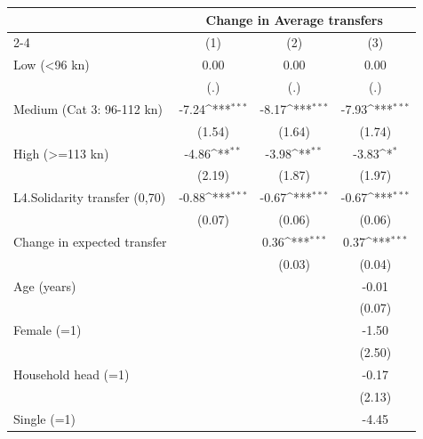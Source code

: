{
\def\sym#1{\ifmmode^{#1}\else\(^{#1}\)\fi}
\begin{tabular}{l*{3}{c}}
\toprule
                    &\multicolumn{3}{c}{Change in Average transfers}                  \\\cmidrule(lr){2-4}
                    &\multicolumn{1}{c}{(1)}         &\multicolumn{1}{c}{(2)}         &\multicolumn{1}{c}{(3)}         \\
\midrule
Low (<96 kn)        &        0.00         &        0.00         &        0.00         \\
                    &         (.)         &         (.)         &         (.)         \\
Medium (Cat 3: 96-112 kn)&       -7.24\sym{***}&       -8.17\sym{***}&       -7.93\sym{***}\\
                    &      (1.54)         &      (1.64)         &      (1.74)         \\
High (>=113 kn)     &       -4.86\sym{**} &       -3.98\sym{**} &       -3.83\sym{*}  \\
                    &      (2.19)         &      (1.87)         &      (1.97)         \\
L4.Solidarity transfer (0,70)&       -0.88\sym{***}&       -0.67\sym{***}&       -0.67\sym{***}\\
                    &      (0.07)         &      (0.06)         &      (0.06)         \\
Change in expected transfer&                     &        0.36\sym{***}&        0.37\sym{***}\\
                    &                     &      (0.03)         &      (0.04)         \\
Age (years)         &                     &                     &       -0.01         \\
                    &                     &                     &      (0.07)         \\
Female (=1)         &                     &                     &       -1.50         \\
                    &                     &                     &      (2.50)         \\
Household head (=1) &                     &                     &       -0.17         \\
                    &                     &                     &      (2.13)         \\
Single (=1)         &                     &                     &       -4.45         \\

\end{tabular}}
